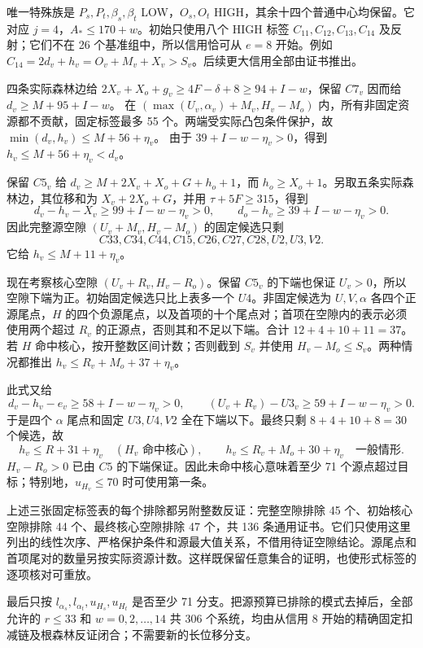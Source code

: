 \documentclass[11pt,a4paper]{article}
\begin{document}
唯一特殊族是 \(P_s,P_t,\beta_s,\beta_t\) LOW，\(O_s,O_t\)
HIGH，其余十四个普通中心均保留。它对应
\(j=4\)，\(A_*\le170+w\)。初始只使用八个 HIGH 标签
\(C_{11},C_{12},C_{13},C_{14}\) 及反射；它们不在 26
个基准组中，所以信用恰可从 \(e=8\) 开始。例如
\(C_{14}=2d_v+h_v=O_v+M_v+X_v>S_v\)。后续更大信用全部由证书推出。

四条实际森林边给 \(2X_v+X_o+g_v\ge4F-\delta+8\ge94+I-w\)，保留 \(C7_v\)
因而给 \(d_v\ge M+95+I-w\)。 在 \((\max(U_v,\alpha_v)+M_v,H_v-M_o)\)
内，所有非固定资源都不贡献，固定标签最多 55
个。两端受实际凸包条件保护，故 \(\min(d_v,h_v)\le M+56+\eta_v\)。 由于
\(39+I-w-\eta_v>0\)，得到 \(h_v\le M+56+\eta_v<d_v\)。

保留 \(C5_v\) 给 \(d_v\ge M+2X_v+X_o+G+h_o+1\)，而
\(h_o\ge X_o+1\)。另取五条实际森林边，其位移和为 \(X_v+2X_o+G\)，并用
\(\tau+5F\ge315\)，得到 \[
 d_v-h_v-X_v\ge99+I-w-\eta_v>0,
 \qquad d_o-h_v\ge39+I-w-\eta_v>0.
\] 因此完整源空隙 \((U_v+M_v,H_v-M_o)\) 的固定候选只剩 \[
 C33,C34,C44,C15,C26,C27,C28,U2,U3,V2.
\] 它给 \(h_v\le M+11+\eta_v\)。

现在考察核心空隙 \((U_v+R_v,H_v-R_o)\)。保留 \(C5_v\) 的下端也保证
\(U_v>0\)，所以空隙下端为正。初始固定候选只比上表多一个
\(U4\)。非固定候选为 \(U,V,\alpha\) 各四个正源尾点，\(H\)
的四个负源尾点，以及首项的十个尾点对；首项在空隙内的表示必须使用两个超过
\(R_v\) 的正源点，否则其和不足以下端。合计 \(12+4+10+11=37\)。若 \(H\)
命中核心，按开整数区间计数；否则截到 \(S_v\) 并使用
\(H_v-M_o\le S_v\)。两种情况都推出 \(h_v\le R_v+M_o+37+\eta_v\)。

此式又给 \[
 d_v-h_v-e_v\ge58+I-w-\eta_v>0,
 \qquad (U_v+R_v)-U3_v\ge59+I-w-\eta_v>0.
\] 于是四个 \(\alpha\) 尾点和固定 \(U3,U4,V2\) 全在下端以下。最终只剩
\(8+4+10+8=30\) 个候选，故 \[
 h_v\le R+31+\eta_v\quad(H_v\text{ 命中核心}),\qquad
 h_v\le R_v+M_o+30+\eta_v\quad\text{一般情形}.
\] \(H_v-R_o>0\) 已由 \(C5\) 的下端保证。因此未命中核心意味着至少 71
个源点超过目标；特别地，\(u_{H_v}\le70\) 时可使用第一条。

上述三张固定标签表的每个排除都另附整数反证：完整空隙排除 45
个、初始核心空隙排除 44 个、最终核心空隙排除 47 个，共 136
条通用证书。它们只使用这里列出的线性次序、严格保护条件和源最大值关系，不借用待证空隙结论。源尾点和首项尾对的数量另按实际资源计数。这样既保留任意集合的证明，也使形式标签的逐项核对可重放。

最后只按 \(l_{\alpha_s},l_{\alpha_t},u_{H_s},u_{H_t}\) 是否至少 71
分支。把源预算已排除的模式去掉后，全部允许的 \(r\le33\) 和
\(w=0,2,\ldots,14\) 共 306 个系统，均由从信用 8
开始的精确固定扣减链及根森林反证闭合；不需要新的长位移分支。
\end{document}

